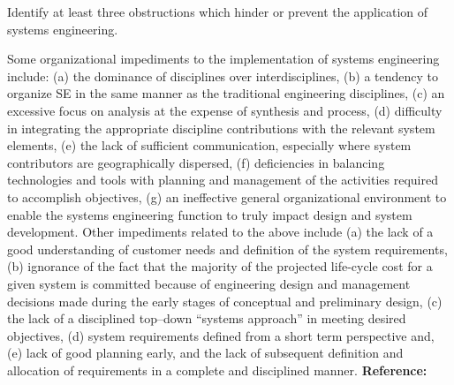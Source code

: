 \begin{exercises}
    \begin{exercise}
    \label{sea-2-23}
        Identify at least three obstructions which hinder or prevent the application of systems engineering.
    \end{exercise}
    \begin{solution}
        Some organizational impediments to the implementation of systems engineering include: (a) the dominance of disciplines over interdisciplines, (b) a tendency to organize SE in the same manner as the traditional engineering disciplines, (c) an excessive focus on analysis at the expense of synthesis and process, (d) difficulty in integrating the appropriate discipline contributions with the relevant system elements, (e) the lack of sufficient communication, especially where system contributors are geographically dispersed, (f) deficiencies in balancing technologies and tools with planning and management of the activities required to accomplish objectives, (g) an ineffective general organizational environment to enable the systems engineering function to truly impact design and system development. Other impediments related to the above include (a) the lack of a good understanding of customer needs and definition of the system requirements, (b) ignorance of the fact that the majority of the projected life-cycle cost for a given system is committed because of engineering design and management decisions made during the early stages of conceptual and preliminary design, (c) the lack of a disciplined top–down “systems approach” in meeting desired objectives, (d) system requirements defined from a short term perspective and, (e) lack of good planning early, and the lack of subsequent definition and allocation of requirements in a complete and disciplined manner. \textbf{Reference:}
    \end{solution}
    

\end{exercises}
